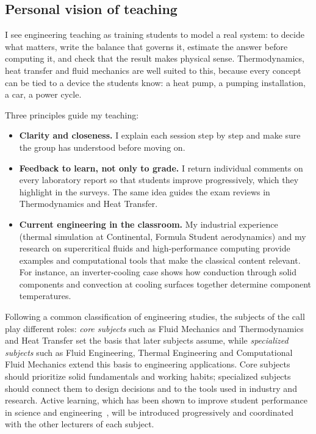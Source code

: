\documentclass[11pt]{article}
\begin{document}
\subsection{Personal vision of teaching}
I see engineering teaching as training students to model a real system: to decide what
matters, write the balance that governs it, estimate the answer before computing it, and
check that the result makes physical sense. Thermodynamics, heat transfer and fluid
mechanics are well suited to this, because every concept can be tied to a device the
students know: a heat pump, a pumping installation, a car, a power cycle.

Three principles guide my teaching:
\begin{itemize}
  \item \textbf{Clarity and closeness.} I explain each session step by step and make sure
  the group has understood before moving on.
  \item \textbf{Feedback to learn, not only to grade.} I return individual comments on
  every laboratory report so that students improve progressively, which they highlight in
  the surveys. The same idea guides the exam reviews in Thermodynamics and Heat Transfer.
  \item \textbf{Current engineering in the classroom.} My industrial experience (thermal
  simulation at Continental, Formula Student aerodynamics) and my research on supercritical
  fluids and high-performance computing provide examples and computational tools that make
  the classical content relevant. For instance, an inverter-cooling case shows how
  conduction through solid components and convection at cooling surfaces together
  determine component temperatures.
\end{itemize}

Following a common classification of engineering studies, the subjects of the call play
different roles: \emph{core subjects} such as Fluid Mechanics and Thermodynamics and Heat
Transfer set the basis that later subjects assume, while \emph{specialized subjects} such
as Fluid Engineering, Thermal Engineering and Computational Fluid Mechanics extend this
basis to engineering applications. Core subjects should prioritize solid fundamentals and
working habits; specialized subjects should connect them to design decisions and to the
tools used in industry and research. Active learning, which has been shown to improve
student performance in science and engineering~\cite{Freeman2014}, will be introduced
progressively and coordinated with the other lecturers of each subject.
\end{document}
